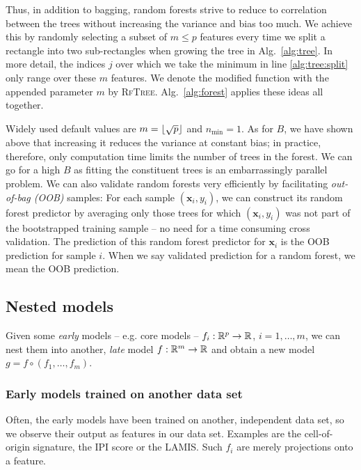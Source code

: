 Thus, in addition to bagging, random forests strive to reduce to correlation between the trees 
without increasing the variance and bias too much. We achieve this by randomly selecting a subset
of $m \leq p$ features every time we split a rectangle into two sub-rectangles when growing the 
tree in Alg.\ \ref{alg:tree}. In more detail, the indices $j$ over which we take the minimum in 
line \ref{alg:tree:split} only range over 
these $m$ features. We denote the modified function with the appended parameter $m$ by 
\textsc{RfTree}. Alg.\ \ref{alg:forest} applies these ideas all together.



Widely used default values are $m = \lfloor\sqrt{p}\rfloor$ and $n_\text{min} = 1$. As for $B$, we have 
shown above that increasing it reduces the variance at constant bias; in practice, therefore, only 
computation time limits the number of trees in the forest. We can go for a high $B$ as fitting the 
constituent trees is an embarrassingly parallel problem. We can 
also validate random forests very efficiently by facilitating \textit{out-of-bag (OOB)} samples: 
For each sample $(\mathbf{x}_i, y_i)$, we can construct its random forest predictor by averaging only those 
trees for which $(\mathbf{x}_i, y_i)$ was not part of the bootstrapped training sample -- no need for a time 
consuming cross validation. The prediction of this random forest predictor for $\mathbf{x}_i$ is the OOB 
prediction for sample $i$. When we say validated prediction for a random forest, we mean the 
OOB prediction.

\subsection{Nested models}\label{subsec:nested-models}

Given some \textit{early} models -- e.g. core models -- $f_i: \mathbb{R}^p \to \mathbb{R}$, $i = 1, \ldots, m$, 
we can nest them into another, \textit{late} model $f: \mathbb{R}^m \to \mathbb{R}$ and obtain a new model 
$g = f \circ (f_1, \ldots, f_m)$. 

\subsubsection{Early models trained on another data set}
Often, the early models have been trained on another, independent data set, so we observe their 
output as features in our data set. Examples are the cell-of-origin signature, the IPI score or the 
LAMIS. Such $f_i$ are merely projections onto a feature.

